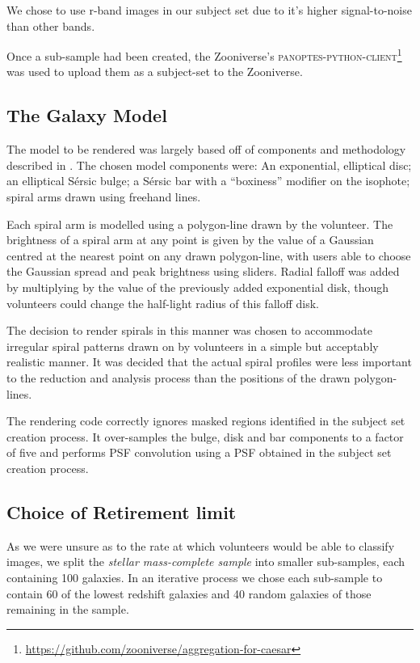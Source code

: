 \documentclass[../main.tex]{subfiles}
\begin{document}
We chose to use r-band images in our subject set due to it's higher signal-to-noise than other bands.

Once a sub-sample had been created, the Zooniverse's \textsc{panoptes-python-client}\footnote{\url{https://github.com/zooniverse/aggregation-for-caesar}} was used to upload them as a subject-set to the Zooniverse.


\subsection{The Galaxy Model}
\label{section:galaxy-model}

The model to be rendered was largely based off of components and methodology described in \citet{galfit-paper}. The chosen model components were: An exponential, elliptical disc; an elliptical S\'ersic bulge; a S\'ersic bar with a ``boxiness'' modifier on the isophote; spiral arms drawn using freehand lines.

Each spiral arm is modelled using a polygon-line drawn by the volunteer. The brightness of a spiral arm at any point is given by the value of a Gaussian centred at the nearest point on any drawn polygon-line, with users able to choose the Gaussian spread and peak brightness using sliders. Radial falloff was added by multiplying by the value of the previously added exponential disk, though volunteers could change the half-light radius of this falloff disk.

The decision to render spirals in this manner was chosen to accommodate irregular spiral patterns drawn on by volunteers in a simple but acceptably realistic manner. It was decided that the actual spiral profiles were less important to the reduction and analysis process than the positions of the drawn polygon-lines.

The rendering code correctly ignores masked regions identified in the subject set creation process. It over-samples the bulge, disk and bar components to a factor of five and performs PSF convolution using a PSF obtained in the subject set creation process.

\subsection{Choice of Retirement limit}
\label{sec:retirement-limit}

As we were unsure as to the rate at which volunteers would be able to classify images, we split the \textit{stellar mass-complete sample} into smaller sub-samples, each containing 100 galaxies. In an iterative process we chose each sub-sample to contain 60 of the lowest redshift galaxies and 40 random galaxies of those remaining in the sample.
\end{document}
